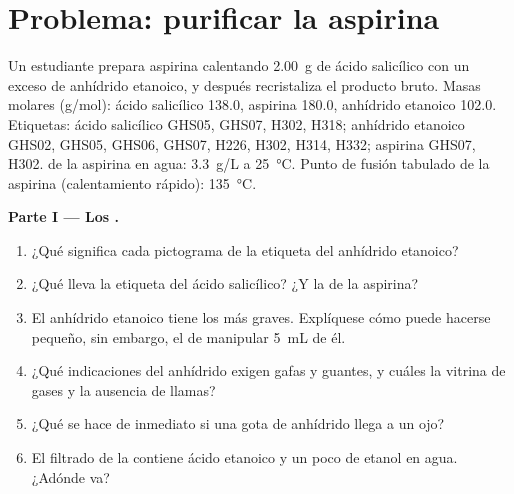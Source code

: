 \section{Problema: purificar la aspirina}

\begin{problem}
\label{pb:b1:lab-techniques-1:1}
Un estudiante prepara aspirina calentando \qty{2.00}{g} de ácido
salicílico con un exceso de anhídrido etanoico, y después recristaliza el
producto bruto. Masas molares (\unit{g/mol}): ácido salicílico
 138.0, aspirina  180.0, anhídrido etanoico
 102.0. Etiquetas: ácido salicílico GHS05, GHS07, H302, H318;
anhídrido etanoico GHS02, GHS05, GHS06, GHS07, H226, H302, H314, H332;
aspirina GHS07, H302.  de la aspirina en agua:
\qty{3.3}{g/L} a \qty{25}{\celsius}. Punto de fusión tabulado de la
aspirina (calentamiento rápido): \qty{135}{\celsius}.

\medskip
\noindent\textbf{Parte I --- Los .}
\begin{enumerate}
  \item ¿Qué significa cada pictograma de la etiqueta del anhídrido
        etanoico?
  \item ¿Qué  lleva la etiqueta del ácido
        salicílico? ¿Y la de la aspirina?
  \item El anhídrido etanoico tiene los  más graves. Explíquese
        cómo puede hacerse pequeño, sin embargo, el  de manipular
        \qty{5}{mL} de él.
  \item ¿Qué indicaciones del anhídrido exigen gafas y guantes, y cuáles
        la vitrina de gases y la ausencia de llamas?
  \item ¿Qué se hace de inmediato si una gota de anhídrido llega a un ojo?
  \item El filtrado de la  contiene ácido etanoico y un
        poco de etanol en agua. ¿Adónde va?
\end{enumerate}


\end{problem}

